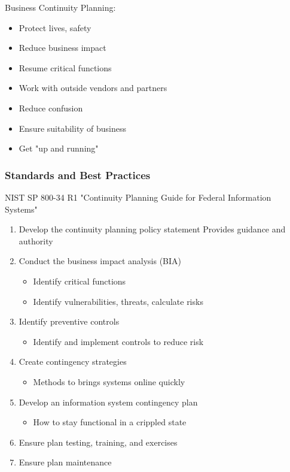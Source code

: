 \documentclass[11pt]{article}
\begin{document}
Business Continuity Planning:
\begin{itemize}
\item Protect lives, safety
\item Reduce business impact
\item Resume critical functions
\item Work with outside vendors and partners
\item Reduce confusion
\item Ensure suitability of business
\item Get "up and running"
\end{itemize}

\subsubsection{Standards and Best Practices}
\label{sec:orgfa9a0a6}
NIST SP 800-34 R1 "Continuity Planning Guide for Federal Information Systems"

\begin{enumerate}
\item Develop the continuity planning policy statement
Provides guidance and authority
\item Conduct the business impact analysis (BIA)
\begin{itemize}
\item Identify critical functions
\item Identify vulnerabilities, threats, calculate risks
\end{itemize}
\item Identify preventive controls
\begin{itemize}
\item Identify and implement controls to reduce risk
\end{itemize}
\item Create contingency strategies
\begin{itemize}
\item Methods to brings systems online quickly
\end{itemize}
\item Develop an information system contingency plan
\begin{itemize}
\item How to stay functional in a crippled state
\end{itemize}
\item Ensure plan testing, training, and exercises
\item Ensure plan maintenance
\end{enumerate}
\end{document}

